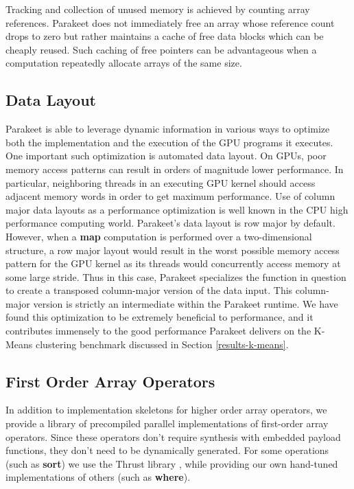 \documentclass[10pt,twocolumn]{article}
\begin{document}
Tracking and collection of unused memory is achieved by counting array references. Parakeet does not immediately free an array whose reference count drops to zero but rather maintains a cache of free data blocks which can be cheaply reused. Such caching of free pointers can be advantageous when a computation repeatedly allocate arrays of the same size. 

\subsection{Data Layout}
\label{datalayout}

Parakeet is able to leverage dynamic information in various ways to optimize both the implementation and the execution of the GPU programs it executes.  One important such optimization is automated data layout.  On GPUs, poor memory access patterns can result in orders of magnitude lower performance.  In particular, neighboring threads in an executing GPU kernel should access adjacent memory words in order to get maximum performance.  Use of column major data layouts as a performance optimization is well known in the CPU high performance computing world.  Parakeet's data layout is row major by default.  However, when a \textbf{map} computation is performed over a two-dimensional structure, a row major layout would result in the worst possible memory access pattern for the GPU kernel as its threads would concurrently access memory at some large stride.  Thus in this case, Parakeet specializes the function in question to create a transposed column-major version of the data input.  This column-major version is strictly an intermediate within the Parakeet runtime.  We have found this optimization to be extremely beneficial to performance, and it contributes immensely to the good performance Parakeet delivers on the K-Means clustering benchmark discussed in Section \ref{results-k-means}.

\subsection{First Order Array Operators}
In addition to implementation skeletons for higher order array operators, we provide a library of precompiled parallel implementations of first-order array operators. Since these operators don't require synthesis with embedded payload functions, they don't need to be dynamically generated. For some operations (such as \textbf{sort}) we use the Thrust library \cite{Hobe10}, while providing our own hand-tuned implementations of others (such as \textbf{where}).
\end{document}
